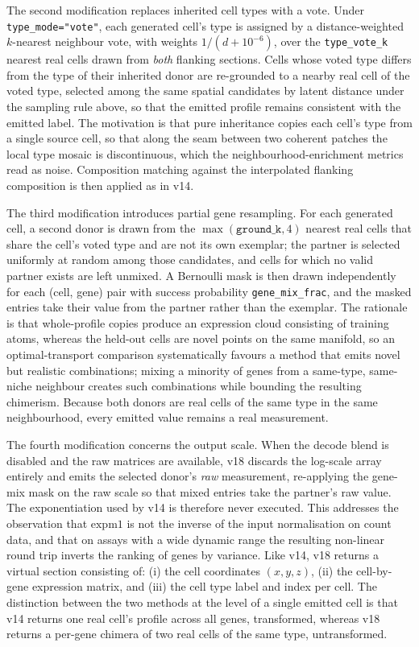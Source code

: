 The second modification replaces inherited cell types with a vote. Under
\texttt{type\_mode="vote"}, each generated cell's type is assigned by a distance-weighted $k$-nearest
neighbour vote, with weights $1/(d + 10^{-6})$, over the \texttt{type\_vote\_k} nearest real cells
drawn from \textit{both} flanking sections. Cells whose voted type differs from the type of their
inherited donor are re-grounded to a nearby real cell of the voted type, selected among the same
spatial candidates by latent distance under the sampling rule above, so that the emitted profile
remains consistent with the emitted label. The motivation is that pure inheritance copies each cell's
type from a single source cell, so that along the seam between two coherent patches the local type
mosaic is discontinuous, which the neighbourhood-enrichment metrics read as noise. Composition
matching against the interpolated flanking composition is then applied as in v14.

The third modification introduces partial gene resampling. For each generated cell, a second donor is
drawn from the $\max(\texttt{ground\_k}, 4)$ nearest real cells that share the cell's voted type and
are not its own exemplar; the partner is selected uniformly at random among those candidates, and
cells for which no valid partner exists are left unmixed. A Bernoulli mask is then drawn independently
for each (cell, gene) pair with success probability \texttt{gene\_mix\_frac}, and the masked entries
take their value from the partner rather than the exemplar. The rationale is that whole-profile copies
produce an expression cloud consisting of training atoms, whereas the held-out cells are novel points
on the same manifold, so an optimal-transport comparison systematically favours a method that emits
novel but realistic combinations; mixing a minority of genes from a same-type, same-niche neighbour
creates such combinations while bounding the resulting chimerism. Because both donors are real cells
of the same type in the same neighbourhood, every emitted value remains a real measurement.

The fourth modification concerns the output scale. When the decode blend is disabled and the raw
matrices are available, v18 discards the log-scale array entirely and emits the selected donor's
\textit{raw} measurement, re-applying the gene-mix mask on the raw scale so that mixed entries take
the partner's raw value. The exponentiation used by v14 is therefore never executed. This addresses
the observation that $\textrm{expm1}$ is not the inverse of the input normalisation on count data, and
that on assays with a wide dynamic range the resulting non-linear round trip inverts the ranking of
genes by variance. Like v14, v18 returns a virtual section consisting of: (i) the cell coordinates
$(x, y, z)$, (ii) the cell-by-gene expression matrix, and (iii) the cell type label and index per
cell. The distinction between the two methods at the level of a single emitted cell is that v14
returns one real cell's profile across all genes, transformed, whereas v18 returns a per-gene chimera
of two real cells of the same type, untransformed.
